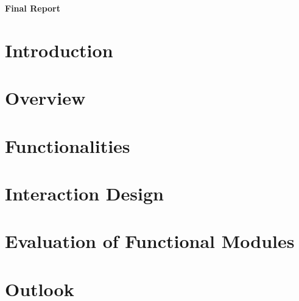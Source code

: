 \documentclass[a4paper,landscape]{article}
\begin{document}
\begin{minipage}[H]{\textwidth}
\vspace{0.3cm}
		\begin{center}
		  \vspace{0.3cm}
		  \Huge{\textbf{Final Report}}\\
	      \vspace{0.3cm}	
   		  \vspace{0.7cm}	
		\end{center}
\end{minipage}
	\section{Introduction}
	
	\section{Overview}
	
	\section{Functionalities}
	
	\section{Interaction Design}
	
	\section{Evaluation of Functional Modules}
	
	\section{Outlook}
	
	
\end{document}
